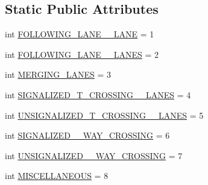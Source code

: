 \subsection*{Static Public Attributes}
\begin{DoxyCompactItemize}
\item 
int \hyperlink{classimplementation_1_1actor__situation__class__detection_1_1situation__class_1_1_situation_class_type_a265c63027258d4b55271cc723cb696a8}{F\+O\+L\+L\+O\+W\+I\+N\+G\+\_\+\+L\+A\+N\+E\+\_\+\_\+\+L\+A\+NE} = 1
\item 
int \hyperlink{classimplementation_1_1actor__situation__class__detection_1_1situation__class_1_1_situation_class_type_a83453d8bbf3d47c3ebb44fc75183aa77}{F\+O\+L\+L\+O\+W\+I\+N\+G\+\_\+\+L\+A\+N\+E\+\_\+\_\+\+L\+A\+N\+ES} = 2
\item 
int \hyperlink{classimplementation_1_1actor__situation__class__detection_1_1situation__class_1_1_situation_class_type_abcfeb3c7fa647038317448846c9834fe}{M\+E\+R\+G\+I\+N\+G\+\_\+\+L\+A\+N\+ES} = 3
\item 
int \hyperlink{classimplementation_1_1actor__situation__class__detection_1_1situation__class_1_1_situation_class_type_a3cf35050d8937317d775473de02ea86e}{S\+I\+G\+N\+A\+L\+I\+Z\+E\+D\+\_\+\+T\+\_\+\+C\+R\+O\+S\+S\+I\+N\+G\+\_\+\_\+\+L\+A\+N\+ES} = 4
\item 
int \hyperlink{classimplementation_1_1actor__situation__class__detection_1_1situation__class_1_1_situation_class_type_a1a8e6e2308d740f6c0e611129d991ee2}{U\+N\+S\+I\+G\+N\+A\+L\+I\+Z\+E\+D\+\_\+\+T\+\_\+\+C\+R\+O\+S\+S\+I\+N\+G\+\_\+\_\+\+L\+A\+N\+ES} = 5
\item 
int \hyperlink{classimplementation_1_1actor__situation__class__detection_1_1situation__class_1_1_situation_class_type_a3a5d96fb10a8d4bd210fccbd808a0167}{S\+I\+G\+N\+A\+L\+I\+Z\+E\+D\+\_\+\_\+\+W\+A\+Y\+\_\+\+C\+R\+O\+S\+S\+I\+NG} = 6
\item 
int \hyperlink{classimplementation_1_1actor__situation__class__detection_1_1situation__class_1_1_situation_class_type_ad826eb0f403ae25454c93f66aca1d750}{U\+N\+S\+I\+G\+N\+A\+L\+I\+Z\+E\+D\+\_\+\_\+\+W\+A\+Y\+\_\+\+C\+R\+O\+S\+S\+I\+NG} = 7
\item 
int \hyperlink{classimplementation_1_1actor__situation__class__detection_1_1situation__class_1_1_situation_class_type_afe96548ef6e393ce55333d68f466c06c}{M\+I\+S\+C\+E\+L\+L\+A\+N\+E\+O\+US} = 8
\end{DoxyCompactItemize}


